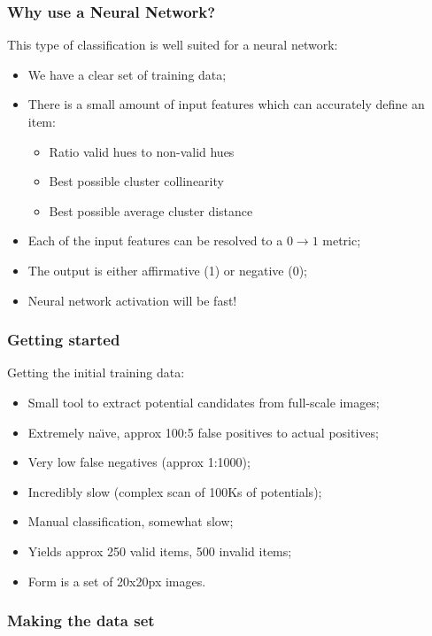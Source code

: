 \documentclass{beamer}
\begin{document}
\begin{frame}
    \frametitle{Why use a Neural Network?}
    This type of classification is well suited for a neural network:
    \begin{itemize}
        \item We have a clear set of training data;
        \item There is a small amount of input features which can accurately
        define an item:
        \begin{itemize}
            \item Ratio valid hues to non-valid hues
            \item Best possible cluster collinearity
            \item Best possible average cluster distance
        \end{itemize}
        \item Each of the input features can be resolved to a $0\to 1$ metric;
        \item The output is either affirmative (1) or negative (0);
        \item Neural network activation will be fast!
    \end{itemize}
\end{frame}

\begin{frame}
    \frametitle{Getting started}
    Getting the initial training data:
    \begin{itemize}
        \item Small tool to extract potential candidates from full-scale images;
        \item Extremely na\"{\i}ve, approx 100:5 false positives to actual positives;
        \item Very low false negatives (approx 1:1000);
        \item Incredibly slow (complex scan of 100Ks of potentials);
        \item Manual classification, somewhat slow;
        \item Yields approx 250 valid items, 500 invalid items;
        \item Form is a set of 20x20px images.
    \end{itemize}
\end{frame}

\begin{frame}[fragile]
    \frametitle{Making the data set}
    \inputminted[firstline=2,lastline=2,linenos,frame=lines,firstnumber=2]{python}{brain.py}
    \inputminted[firstline=15,lastline=26,linenos,frame=lines,firstnumber=15]{python}{brain.py}
\end{frame}
\end{document}
